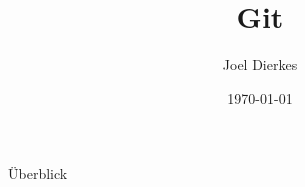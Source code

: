 \documentclass[handout]{beamer}
\title{Git}
\author{Joel Dierkes}
\date{\today}
\begin{document}
\maketitle
\begin{frame}{Überblick}
\tableofcontents
\end{frame}


\end{document}
